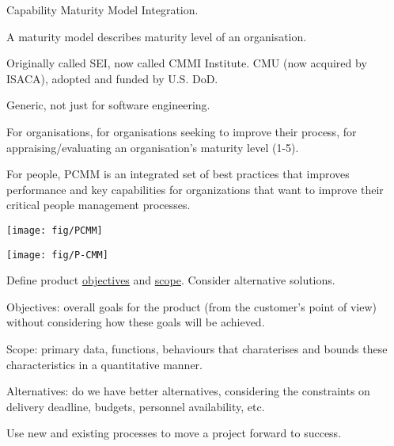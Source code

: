 \documentclass[landscape,30pt]{foils}
\begin{document}

Capability Maturity Model Integration.

A maturity model describes maturity level of an organisation.

Originally called SEI, now called CMMI Institute. CMU (now acquired by ISACA), adopted and funded by U.S. DoD.

Generic, not just for software engineering.

For organisations, for organisations seeking to improve their process,  for appraising/evaluating an organisation's maturity level (1-5).

For people, PCMM is an integrated set of best practices that improves performance and key capabilities for organizations that want to improve their critical people management processes.

\begin{center}
\texttt{[image: fig/PCMM]}
\end{center}

\begin{center}
\texttt{[image: fig/P-CMM]}
\end{center}


Define product \underline{objectives} and \underline{scope}.  Consider alternative solutions.

Objectives: overall goals for the product (from the customer's point of view) without considering how these goals will be achieved.

Scope: primary data, functions, behaviours that charaterises and bounds these characteristics in a quantitative manner.

Alternatives: do we have better alternatives, considering the constraints on delivery deadline, budgets, personnel availability, etc. 





Use new and existing processes to move a project forward to success.
\end{document}
